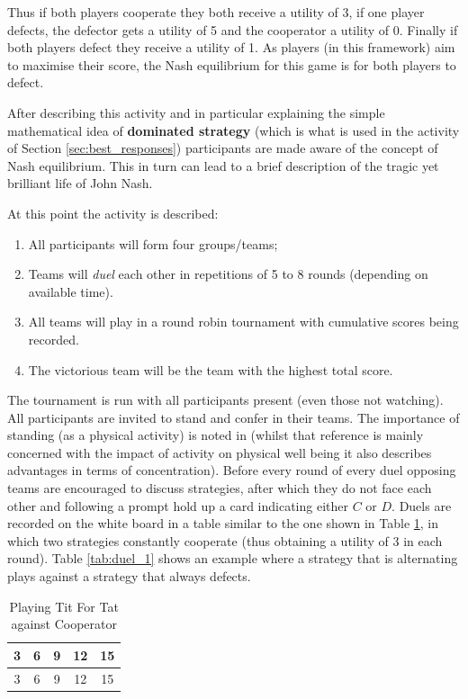\documentclass[12pt]{article}
\begin{document}
Thus if both players cooperate they both receive a utility of 3, if one player
defects, the defector gets a utility of 5 and the cooperator a utility of 0.
Finally if both players defect they receive a utility of 1. As players (in this
framework) aim to maximise their score, the Nash equilibrium for this game is
for both players to defect.

After describing this activity and in particular explaining the simple
mathematical idea of \textbf{dominated strategy} (which is what is used in the
activity of Section \ref{sec:best_responses}) participants are made aware of the
concept of Nash equilibrium. This in turn can lead to a brief description of the
tragic yet brilliant life of John Nash.

At this point the activity is described:

\begin{enumerate}
    \item All participants will form four groups/teams;
    \item Teams will \textit{duel} each other in repetitions of 5 to 8 rounds
        (depending on available time).
    \item All teams will play in a round robin tournament with cumulative scores
        being recorded.
    \item The victorious team will be the team with the highest total score.
\end{enumerate}

The tournament is run with all participants present (even those not watching).
All participants are invited to stand and confer in their teams. The importance
of standing (as a physical activity) is noted in \cite{Donnelly2011} (whilst
that reference is mainly concerned with the impact of activity on physical well
being it also describes advantages in terms of concentration).  Before every
round of every duel opposing teams are encouraged to discuss strategies, after
which they do not face each other and following a prompt hold up a card
indicating either \(C\) or \(D\).  Duels are recorded on the white board in a
table similar to the one shown in Table \ref{tab:duel}, in which two strategies
constantly cooperate (thus obtaining a utility of 3 in each round). Table
\ref{tab:duel_1} shows an example where a strategy that is alternating plays
against a strategy that always defects.

\begin{table}[!htbp]
    \caption{Playing Tit For Tat against Cooperator}
    \centering
    \begin{tabular}{ccccc}
        \toprule
        3&6&9&12&15\\
        \midrule
        3&6&9&12&15\\
        \bottomrule
    \end{tabular}
    \label{tab:duel}
\end{table}
\end{document}
